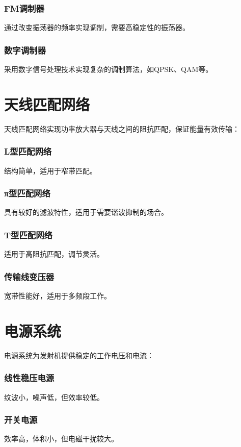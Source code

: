 \documentclass[12pt,UTF8]{ctexbook}
\begin{document}
\subsubsection{FM调制器}
通过改变振荡器的频率实现调制，需要高稳定性的振荡器。

\subsubsection{数字调制器}
采用数字信号处理技术实现复杂的调制算法，如QPSK、QAM等。

\section{天线匹配网络}

天线匹配网络实现功率放大器与天线之间的阻抗匹配，保证能量有效传输：

\subsubsection{L型匹配网络}
结构简单，适用于窄带匹配。

\subsubsection{π型匹配网络}
具有较好的滤波特性，适用于需要谐波抑制的场合。

\subsubsection{T型匹配网络}
适用于高阻抗匹配，调节灵活。

\subsubsection{传输线变压器}
宽带性能好，适用于多频段工作。

\section{电源系统}

电源系统为发射机提供稳定的工作电压和电流：

\subsubsection{线性稳压电源}
纹波小，噪声低，但效率较低。

\subsubsection{开关电源}
效率高，体积小，但电磁干扰较大。
\end{document}
